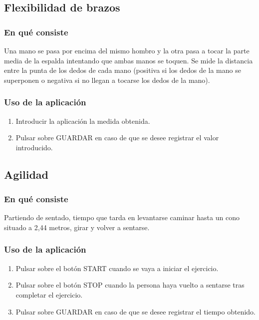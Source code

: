 \subsection{Flexibilidad de brazos}

\subsubsection{En qué consiste}

Una mano se pasa por encima del mismo hombro y la otra pasa a tocar la parte media de la espalda intentando que ambas manos se toquen. Se mide la distancia entre la punta de los dedos de cada mano (positiva si los dedos de la mano se superponen o negativa si no llegan a tocarse los dedos de la mano).

\subsubsection{Uso de la aplicación}

\begin{enumerate}
\item Introducir la aplicación la medida obtenida.
\item Pulsar sobre GUARDAR en caso de que se desee registrar el valor introducido.
\end{enumerate}

\subsection{Agilidad}

\subsubsection{En qué consiste}

Partiendo de sentado, tiempo que tarda en levantarse caminar hasta un cono situado a 2,44 metros, girar y volver a sentarse.

\subsubsection{Uso de la aplicación}

\begin{enumerate}
\item Pulsar sobre el botón START cuando se vaya a iniciar el ejercicio.
\item Pulsar sobre el botón STOP cuando la persona haya vuelto a sentarse tras completar el ejercicio.
\item Pulsar sobre GUARDAR en caso de que se desee registrar el tiempo obtenido.
\end{enumerate}

